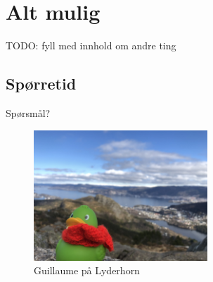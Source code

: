 \section{Alt mulig}
\begin{frame}{}
    TODO: fyll med innhold om andre ting
\end{frame}

\subsection*{Spørretid}
\begin{frame}{Spørsmål?}
    \begin{figure}
        \centering
        \includegraphics[height = 4.9cm]{images/guillaume8.jpg}
        \caption{Guillaume på Lyderhorn}
        \label{fig:guillaume8}
    \end{figure}
\end{frame}


